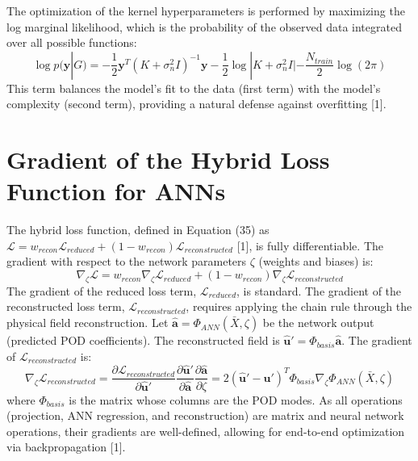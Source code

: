 \documentclass[dsc, EN]{ufabcFHZh}
\begin{document}
The optimization of the kernel hyperparameters is performed by maximizing the log marginal likelihood, which is the probability of the observed data integrated over all possible functions:
\begin{equation}
    \log p(\mathbf{y} | G) = -\frac{1}{2} \mathbf{y}^T (K + \sigma_n^2 I)^{-1} \mathbf{y} - \frac{1}{2} \log |K + \sigma_n^2 I| - \frac{N_{train}}{2} \log(2\pi)
\end{equation}
This term balances the model's fit to the data (first term) with the model's complexity (second term), providing a natural defense against overfitting {[1]}.

\section{Gradient of the Hybrid Loss Function for ANNs}
\label{sec:loss_derivation}

The hybrid loss function, defined in Equation (35) as $\mathcal{L} = w_{recon}\mathcal{L}_{reduced} + (1 - w_{recon})\mathcal{L}_{reconstructed}$ {[1]}, is fully differentiable. The gradient with respect to the network parameters $\zeta$ (weights and biases) is:
\begin{equation}
    \nabla_\zeta \mathcal{L} = w_{recon} \nabla_\zeta \mathcal{L}_{reduced} + (1 - w_{recon}) \nabla_\zeta \mathcal{L}_{reconstructed}
\end{equation}
The gradient of the reduced loss term, $\mathcal{L}_{reduced}$, is standard. The gradient of the reconstructed loss term, $\mathcal{L}_{reconstructed}$, requires applying the chain rule through the physical field reconstruction. Let $\hat{\mathbf{a}} = \Phi_{ANN}(\bar{X}, \zeta)$ be the network output (predicted POD coefficients). The reconstructed field is $\hat{\mathbf{u}}' = \Phi_{basis} \hat{\mathbf{a}}$. The gradient of $\mathcal{L}_{reconstructed}$ is:
\begin{equation}
    \nabla_\zeta \mathcal{L}_{reconstructed} = \frac{\partial \mathcal{L}_{reconstructed}}{\partial \hat{\mathbf{u}}'} \frac{\partial \hat{\mathbf{u}}'}{\partial \hat{\mathbf{a}}} \frac{\partial \hat{\mathbf{a}}}{\partial \zeta} = 2(\hat{\mathbf{u}}' - \mathbf{u}')^T \Phi_{basis} \nabla_\zeta \Phi_{ANN}(\bar{X}, \zeta)
\end{equation}
where $\Phi_{basis}$ is the matrix whose columns are the POD modes. As all operations (projection, ANN regression, and reconstruction) are matrix and neural network operations, their gradients are well-defined, allowing for end-to-end optimization via backpropagation {[1]}.
\end{document}
